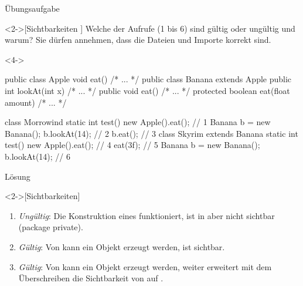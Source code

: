 \ifull
\begin{frame}[c,fragile]{Übungsaufgabe}
    \begin{exercise}<2->[Sichtbarkeiten ]
        Welche der Aufrufe (1 bis 6) sind gültig oder ungültig und warum? Sie dürfen annehmen, dass die Dateien und Importe korrekt sind. \par
\begin{onlyenv}<4->
\begin{minipage}{.7\linewidth}
%
\begin{plainjava}[morekeywords={[3]{Apple,Banana}},belowskip=0pt]
public class Apple { void eat() { /* ... */ } }
public class Banana extends Apple {
  public int lookAt(int x) { /* ... */ }
  public void eat() { /* ... */ }
  protected boolean eat(float amount) { /* ... */ }
}
\end{plainjava}
\begin{plainjava}[multicols=2,morekeywords={[3]{Apple,Banana,Skyrim,Morrowind}},aboveskip=0pt]
class Morrowind {
  static int test() {
    new Apple().eat(); // 1
    Banana b = new Banana();
    b.lookAt(14); // 2
    b.eat(); // 3
}}
class Skyrim extends Banana {
  static int test() {
    new Apple().eat(); // 4
    eat(3f); // 5
    Banana b = new Banana();
    b.lookAt(14); // 6
}}
\end{plainjava}
\end{minipage}%
\end{onlyenv}%
\hfill{}
    \end{exercise}
\end{frame}

\begin{frame}[c]{Lösung}
    \begin{solve}<2->[Sichtbarkeiten]
       \begin{enumerate}[<+(1)->]
            \item \emph{Ungültig}: Die Konstruktion eines  funktioniert,  ist in  aber nicht sichtbar (package private).
            \item \emph{Gültig}: Von  kann ein Objekt erzeugt werden,  ist  sichtbar.
            \item \emph{Gültig}: Von  kann ein Objekt erzeugt werden, weiter erweitert  mit dem Überschreiben die Sichtbarkeit von  auf .
       \end{enumerate}
    \end{solve}
\end{frame}

